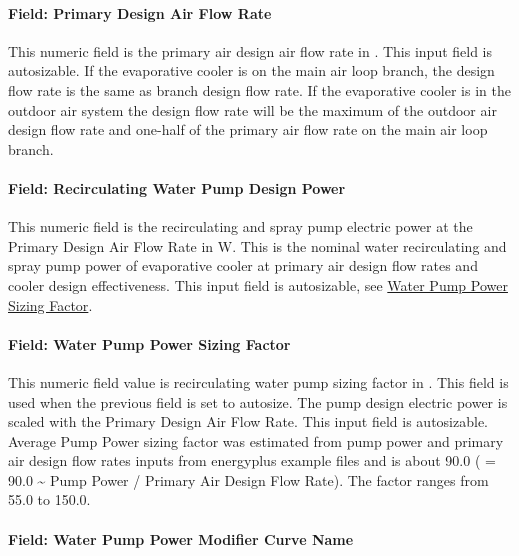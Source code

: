 \paragraph{Field: Primary Design Air Flow Rate}\label{field-primary-design-air-flow-rate}

This numeric field is the primary air design air flow rate in \si{\volumeFlowRate}. This input field is autosizable. If the evaporative cooler is on the main air loop branch, the design flow rate is the same as branch design flow rate. If the evaporative cooler is in the outdoor air system the design flow rate will be the maximum of the outdoor air design flow rate and one-half of the primary air flow rate on the main air loop branch.

\paragraph{Field: Recirculating Water Pump Design Power}

This numeric field is the recirculating and spray pump electric power at the Primary Design Air Flow Rate in \si{\watt}.
This is the nominal water recirculating and spray pump power of evaporative cooler at primary air design flow rates and cooler design effectiveness.
This input field is autosizable, see \hyperref[field-water-pump-power-sizing-factor]{Water Pump Power Sizing Factor}.

\paragraph{Field: Water Pump Power Sizing Factor}\label{field-water-pump-power-sizing-factor}

This numeric field value is recirculating water pump sizing factor in \si{\wattperVolumeFlowRate}.
This field is used when the previous field is set to autosize. The pump design electric power is scaled with the Primary Design Air Flow Rate. This input field is autosizable.
Average Pump Power sizing factor was estimated from pump power and primary air design flow rates inputs from energyplus example files and
is about \SI{90.0}{\wattperVolumeFlowRate} ( = 90.0 \textasciitilde{} Pump Power / Primary Air Design Flow Rate). The factor ranges from 55.0 to \SI{150.0}{\wattperVolumeFlowRate}.

\paragraph{Field: Water Pump Power Modifier Curve Name}\label{field-water-pump-power-modifier-curve-name}


